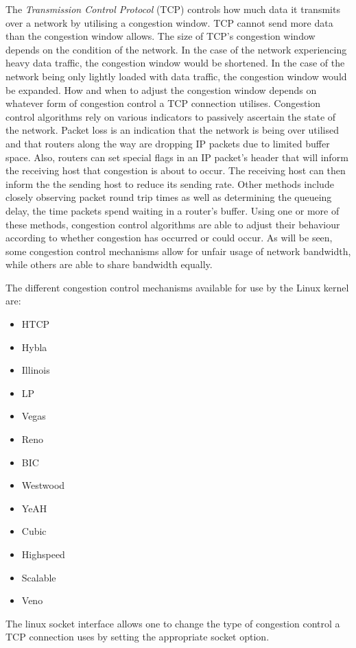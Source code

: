 \documentclass[11pt,a4paper,twocolumn]{article}
\begin{document}
The \textit{Transmission Control Protocol} (TCP) controls how much data it transmits over a network by utilising
a congestion window. TCP cannot send more data than the congestion window allows. The size of TCP's congestion
window depends on the condition of the network. In the case of the network experiencing heavy data traffic, the congestion window
would be shortened. In the case of the network being only lightly loaded with data traffic, the congestion window would
be expanded. How and when to adjust the congestion window depends on whatever form of congestion control
a TCP connection utilises. Congestion control algorithms rely on various indicators to passively ascertain the state of the network.
Packet loss is an indication that the network is being over utilised and that routers along the way are dropping IP packets
due to limited buffer space. Also, routers can set special flags in an IP packet's header that will inform the receiving host
that congestion is about to occur. The receiving host can then inform the the sending host to reduce its sending rate.
Other methods include closely observing packet round trip times as well as determining the queueing delay, the time packets
spend waiting in a router's buffer.
Using one or more of these methods, congestion control algorithms are able to adjust their behaviour according to whether congestion
has occurred or could occur. As will be seen, some congestion control mechanisms allow for unfair usage of network bandwidth,
while others are able to share bandwidth equally.

The different congestion control mechanisms available for use by the Linux kernel are:
\begin{itemize}
\item HTCP
\item Hybla
\item Illinois
\item LP
\item Vegas
\item Reno
\item BIC
\item Westwood
\item YeAH
\item Cubic
\item Highspeed
\item Scalable
\item Veno
\end{itemize}
The linux socket interface allows one to change the type of congestion control a TCP connection uses by setting
the appropriate socket option.
\end{document}
